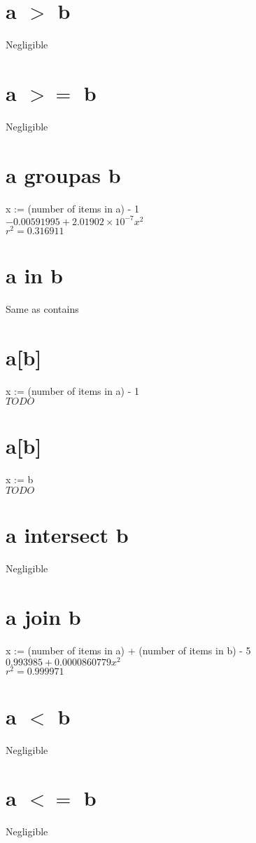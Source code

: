 \documentclass[12pt]{article}
\begin{document}
	\section{a $>$ b}
	Negligible
	
	\section{a $>=$ b}
	Negligible
	
	\section{a groupas b}
	x := (number of items in a) - 1\\
	$-0.00591995 + 2.01902 \times 10^{-7} x^2$\\
	$r^2 = 0.316911$
	
	\section{a in b}
	Same as contains
	
	\section{a[b]}
	x := (number of items in a) - 1\\
	$TODO$
	
	\section{a[b]}
	x := b\\
	$TODO$
	
	\section{a intersect b}
	Negligible
	
	\section{a join b}
	x := (number of items in a) + (number of items in b) - 5\\
	$0.993985 + 0.0000860779 x^2$\\
	$r^2 = 0.999971$
	
	\section{a $<$ b}
	Negligible
	
	\section{a $<=$ b}
	Negligible
	
\end{document}
